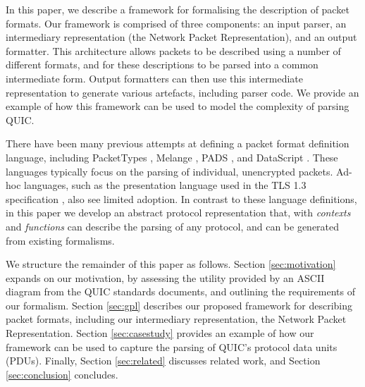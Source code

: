 \documentclass[10pt,sigconf]{acmart}
\begin{document}
In this paper, we describe a framework for formalising the description of packet formats.
Our framework is comprised of three components: an input parser, an intermediary
representation (the Network Packet Representation), and an output formatter. This
architecture allows packets to be described using a number of different formats, and for
these descriptions to be parsed into a common intermediate form. Output formatters can then
use this intermediate representation to generate various artefacts, including parser code.
We provide an example of how this framework can be used to model the complexity of parsing
QUIC.


There have been many previous attempts at defining a packet format definition language,
including PacketTypes \cite{mccann2000packet}, Melange \cite{madhavapeddy2007melange},
PADS \cite{fisher2005pads}, and DataScript \cite{back2002datascript}. These languages
typically focus on the parsing of individual, unencrypted packets. Ad-hoc languages, such
as the presentation language used in the TLS 1.3 specification
\cite{draft-ietf-tls-tls13-28}, also see limited adoption. In contrast to these language
definitions, in this paper we develop an abstract protocol representation that, with
\emph{contexts} and \emph{functions} can describe the parsing of any protocol, and can be
generated from existing formalisms.


We structure the remainder of this paper as follows. Section \ref{sec:motivation} expands
on our motivation, by assessing the utility provided by an ASCII diagram from the QUIC
standards documents, and outlining the requirements of our formalism. Section
\ref{sec:gpl} describes our proposed framework for describing packet formats,
including our intermediary representation, the Network Packet Representation. Section
\ref{sec:casestudy} provides an example of how our framework can be used to capture
the parsing of QUIC's protocol data units (PDUs). Finally, Section \ref{sec:related} discusses
related work, and Section \ref{sec:conclusion} concludes.
\end{document}
